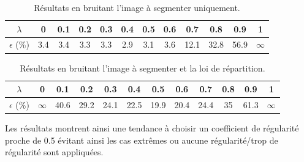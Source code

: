 \documentclass{article}
\begin{document}
\begin{table}[h!]
\begin{center}
  \begin{tabular}{|c|c|c|c|c|c|c|c|c|c|c|c|}
		\hline
		$\lambda$ & 0 & 0.1& 0.2 & 0.3 & 0.4 & 0.5 & 0.6 & 0.7 & 0.8 & 0.9 & 1\\
		\hline
		$\epsilon$ (\%) & 3.4 & 3.4 & 3.3 & 3.3 & 2.9 & 3.1 & 3.6 & 12.1 & 32.8 & 56.9 & $\infty$\\
		\hline
\end{tabular}
\end{center}
\caption{Résultats en bruitant l'image à segmenter uniquement.}
\end{table}

\begin{table}[h!]
\begin{center}
  \begin{tabular}{|c|c|c|c|c|c|c|c|c|c|c|c|}
		\hline
		$\lambda$ & 0 & 0.1& 0.2 & 0.3 & 0.4 & 0.5 & 0.6 & 0.7 & 0.8 & 0.9 & 1\\
		\hline
		$\epsilon$ (\%) & $\infty$ & 40.6 & 29.2 & 24.1 & 22.5 & 19.9 & 20.4 & 24.4 & 35 & 61.3 & $\infty$\\
		\hline
\end{tabular}
\end{center}
\caption{Résultats en bruitant l'image à segmenter et la loi de répartition.}
\end{table}

Les résultats montrent ainsi une tendance à choisir un coefficient de régularité proche de 0.5 évitant ainsi les cas extrêmes ou aucune régularité/trop de régularité sont appliquées.

\end{document}
